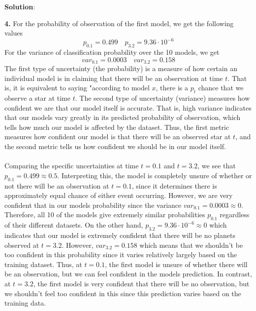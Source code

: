 \documentclass[submit]{../harvardml}
\newenvironment{solution}{
    \vspace{2mm}
    \color{black}\noindent\textbf{Solution}:
}{}
\begin{document}
\begin{solution}
\begin{tcolorbox}
    \end{tcolorbox}
    \begin{tcolorbox}
        \textbf{4.} For the probability of observation of the first model, we get the following values
        $$p_{0.1} = 0.499 \quad p_{3.2} = 9.36 \cdot 10^{-6}$$
        For the variance of classification probability over the 10 models, we get
        $$var_{0.1} = 0.0003 \quad var_{3.2} = 0.158$$
        The first type of uncertainty (the probability) is a measure of how certain an individual model is in claiming that there will be an observation at time $t$. That is, it is equivalent to saying "according to model $x$, there is a $p_t$ chance that we observe a star at time $t$. The second type of uncertainty (variance) measures how confident we are that our model itself is accurate. That is, high variance indicates that our models vary greatly in its predicted probability of observation, which tells how much our model is affected by the dataset. Thus, the first metric measures how confident our model is that there will be an observed star at $t$, and the second metric tells us how confident we should be in our model itself.
        \\
        \\
        Comparing the specific uncertainties at time $t = 0.1$ and $t = 3.2$, we see that $p_{0.1} = 0.499 \approx 0.5$. Interpreting this, the model is completely unsure of whether or not there will be an observation at $t = 0.1$, since it determines there is approximately equal chance of either event occurring. However, we are very confident that in our models probability since the variance $var_{0.1} = 0.0003 \approx 0$. Therefore, all 10 of the models give extremely similar probabilities $p_{0.1}$ regardless of their different datasets. On the other hand, $p_{3.2} = 9.36 \cdot 10^{-6} \approx 0$ which indicates that our model is extremely confident that there will be no planets observed at $t = 3.2$. However, $var_{3.2} = 0.158$ which means that we shouldn't be too confident in this probability since it varies relatively largely based on the training dataset. Thus, at $t = 0.1$, the first model is unsure of whether there will be an observation, but we can feel confident in the models prediction. In contrast, at $t = 3.2$, the first model is very confident that there will be no observation, but we shouldn't feel too confident in this since this prediction varies based on the training data.
    \end{tcolorbox}
    \begin{tcolorbox}

\end{tcolorbox}
\end{solution}
\end{document}
